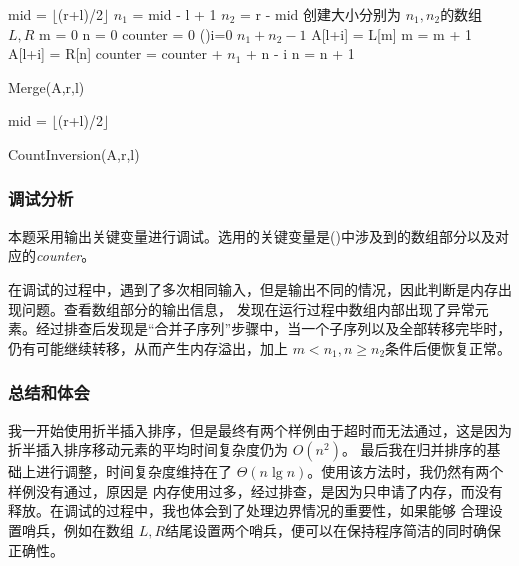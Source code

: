 \begin{function}[H]
    mid = $\lfloor$(r+l)/2$\rfloor$\;
    $n_1$ = mid - l + 1 \;
    $n_2$ = r - mid\;
    创建大小分别为 $n_1,n_2$的数组 $L,R$\;
    m = 0\;
    n = 0\;
    counter = 0\;
    \For(){i=0 \KwTo $n_1+n_2-1$}
    {
        {
            A[l+i] = L[m]\;
            m = m + 1\;
        }
        {
            A[l+i] = R[n]\;
            counter = counter + $n_1$ + n - i\;
            n = n + 1\;
        }
    }
    \caption{Merge(A,r,l)}
\end{function}
\begin{function}
    \;
    \;
    mid = $\lfloor$(r+l)/2$\rfloor$\;
    \;
    \caption{CountInversion(A,r,l)}
\end{function}
\subsubsection{调试分析}
本题采用输出关键变量进行调试。选用的关键变量是\Merge()中涉及到的数组部分以及对应的\emph{counter}。

在调试的过程中，遇到了多次相同输入，但是输出不同的情况，因此判断是内存出现问题。查看数组部分的输出信息，
发现在运行过程中数组内部出现了异常元素。经过排查后发现是“合并子序列”步骤中，当一个子序列以及全部转移完毕时，
仍有可能继续转移，从而产生内存溢出，加上 $m<n_1,n\geq n_2$条件后便恢复正常。
\subsubsection{总结和体会}
我一开始使用折半插入排序，但是最终有两个样例由于超时而无法通过，这是因为折半插入排序移动元素的平均时间复杂度仍为 $O(n^2)$。
最后我在归并排序的基础上进行调整，时间复杂度维持在了 $\Theta(n\lg n)$。使用该方法时，我仍然有两个样例没有通过，原因是
内存使用过多，经过排查，是因为只申请了内存，而没有释放。在调试的过程中，我也体会到了处理边界情况的重要性，如果能够
合理设置哨兵，例如在数组 $L,R$结尾设置两个哨兵，便可以在保持程序简洁的同时确保正确性。